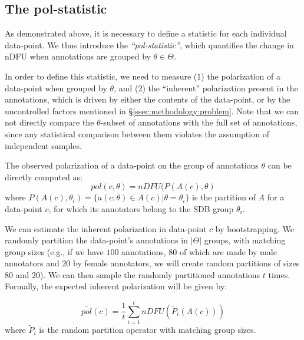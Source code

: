 \documentclass{article}
\begin{document}
 
 
 \subsection{The pol-statistic}
 \label{ssec:methodology:polstat}
  
As demonstrated above, it is necessary to define a statistic for each individual data-point. We thus introduce the \textit{``pol-statistic''}, which quantifies the change in \ac{nDFU} when annotations are grouped by $\theta \in \Theta$.

In order to define this statistic, we need to measure (1) the polarization of a data-point when grouped by $\theta$, and (2) the ``inherent'' polarization present in the annotations, which is driven by either the contents of the data-point, or by the uncontrolled factors mentioned in \S\ref{ssec:methodology:problem}. Note that we can not directly compare the $\theta$-subset of annotations with the full set of annotations, since any statistical comparison between them violates the assumption of independent samples. %

The observed polarization of a data-point on the group of annotations $\theta$ can be directly computed as: 
 \begin{equation}
 	pol(c, \theta) = nDFU(P(A(c), \theta)
 \end{equation}
 \noindent where $P(A(c), \theta_i) = \{a(c; \theta) \in A(c) | \theta=\theta_i\}$ is the partition of $A$ for a data-point $c$, for which its annotators belong to the \ac{SDB} group $\theta_i$.
 
 We can estimate the inherent polarization in data-point $c$ by bootstrapping. We randomly partition the data-point's annotations in $\lvert \Theta \rvert$ groups, with matching group sizes (e.g., if we have $100$ annotations, $80$ of which are made by male annotators and $20$ by female annotators, we will create random partitions of sizes $80$ and $20$). We can then sample the randomly partitioned annotations $t$ times. Formally, the expected inherent polarization will be given by:
 
 \begin{equation}
 	\label{eq:pol_expected}
 	\bar{pol}(c) = \frac{1}{t} \sum_{i=1}^t  \textit{nDFU}(\tilde{P}_i(A(c)))
 \end{equation}
 \noindent where $\tilde{P}_i$ is the random partition operator with matching group sizes.
 
\end{document}
